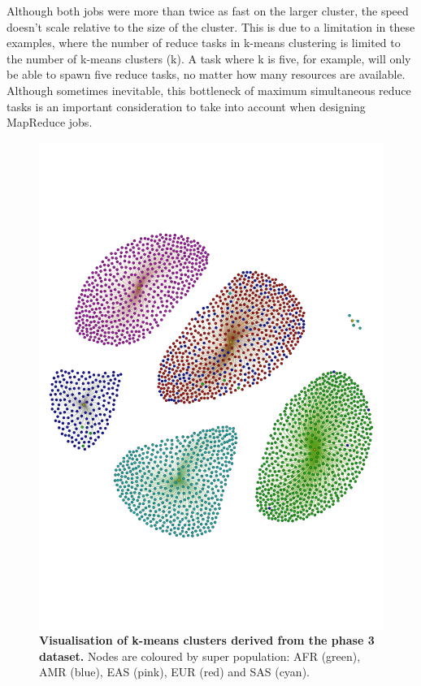 \documentclass{bioinfo}
\begin{document}
Although both jobs were more than twice as fast on the larger cluster, the speed doesn't scale relative to the size of the cluster. This is due to a limitation in these examples, where the number of reduce tasks in k-means clustering is limited to the number of k-means clusters (k).
A task where k is five, for example, will only be able to spawn five reduce tasks, no matter how many resources are available. Although sometimes inevitable, this bottleneck of maximum simultaneous reduce tasks is an important consideration to take into account when designing MapReduce jobs. 

\begin{figure}[!tpb]%
\centerline{\includegraphics[type=pdf,ext=.pdf,read=.pdf, scale=0.40]{gephi-p3}}
        \label{fig:sign}
        \caption{{\bf Visualisation of k-means clusters derived from the phase 3 dataset.}
        Nodes are coloured by super population: AFR (green), AMR (blue), EAS (pink), EUR (red) and SAS (cyan). 
}
\end{figure}
\end{document}
